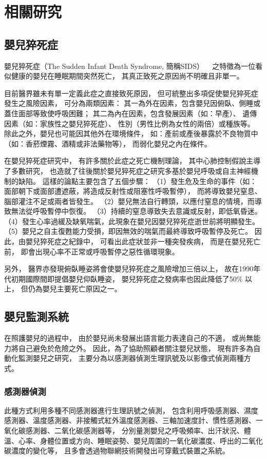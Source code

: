 \documentclass[class=NCU_thesis, crop=false]{standalone}
\begin{document}
\chapter{相關研究}

\section{嬰兒猝死症}
嬰兒猝死症（The Sudden Infant Death Syndrome, 簡稱SIDS）
~\cite{kinney_sudden_2009}
之特徵為一位看似健康的嬰兒在睡眠期間突然死亡，
其真正致死之原因尚不明確且非單一。

目前醫界雖未有單一定義此症之直接致死原因，
但可統整出多項促使嬰兒猝死症發生之風險因素，
可分為兩類因素：
其一為外在因素，包含嬰兒因俯臥、側睡或蓋住面部等致使呼吸困難；
其二為內在因素，包含發展因素（如：早產）、
遺傳因素（如：家族性之嬰兒猝死症）、
性別（男性比例為女性的兩倍）或種族等。
除此之外，嬰兒也可能因其他外在環境條件，
如：產前或產後暴露於不良物質中（如：香菸煙霧、酒精或非法藥物等），
而弱化嬰兒之內在條件。

在嬰兒猝死症研究中，
有許多關於此症之死亡機制理論，
其中心肺控制假說主導了多數研究，
也造就了往後關於嬰兒猝死症之研究多基於嬰兒呼吸或自主神經機制的缺陷。
這樣的論點主要包含了五個步驟：
（1）發生危及生命的事件（如：面部朝下或面部遭遮蔽，將造成反射性或阻塞性呼吸暫停），
而將導致嬰兒窒息、腦部灌注不足或兩者皆發生。
（2）嬰兒無法自行轉頭，以應付窒息的情境，而導致無法從呼吸暫停中恢復。
（3）持續的窒息導致失去意識或反射，即低氧昏迷。
（4）發生心率過緩及缺氧喘氣，此現象在嬰兒因嬰兒猝死症逝世前將明顯發生。
（5）嬰兒之自主復甦能力受損，即因無效的喘氣而最終導致呼吸暫停及死亡。
因此，由嬰兒猝死症之紀錄中，
可看出此症狀並非一種突發疾病，
而是在嬰兒死亡前，
即會出現心率不正常或呼吸暫停之惡性循環現象。

另外，
醫界亦發現俯臥睡姿將會使嬰兒猝死症之風險增加三倍以上，
故在1990年代初期國際間即提倡嬰兒仰臥睡姿，
嬰兒猝死症之發病率也因此降低了50\% 以上，
但仍為嬰兒主要死亡原因之一。

\section{嬰兒監測系統}
在照護嬰兒的過程中，
由於嬰兒尚未發展出語言能力表達自己的不適，
或尚無能力將自己避免於危險之外。
因此，為了協助照顧者關注嬰兒狀態，
現有許多為自動化監測嬰兒之研究，
主要分為以感測器偵測生理訊號及以影像式偵測兩種方式。

\subsection{感測器偵測}
此種方式利用多種不同感測器進行生理訊號之偵測，
包含利用呼吸感測器、濕度感測器、溫度感測器、非接觸式紅外溫度感測器、三軸加速度計、慣性感測器、一氧化碳感測器、二氧化碳感測器等，
分別量測嬰兒之呼吸頻率、出汗狀況、體溫、心率、身體位置或方向、睡眠姿勢、嬰兒周圍的一氧化碳濃度、呼出的二氧化碳濃度的變化等，
且多會透過物聯網技術開發出可穿戴式裝置之系統。
\end{document}
